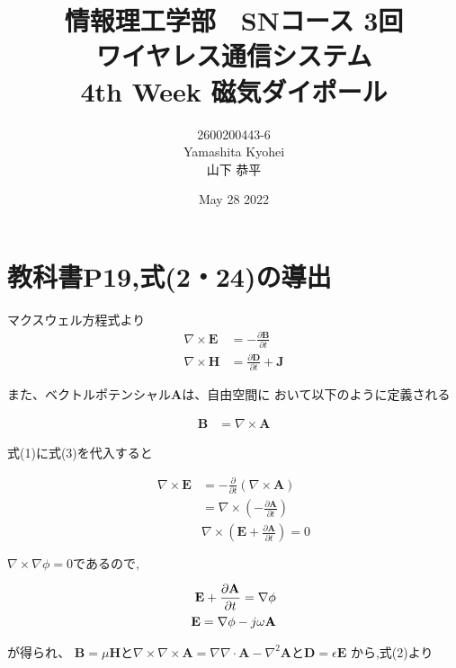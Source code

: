 \documentclass[dvipdfmx,autodetect-engine,titlepage]{jsarticle}
\title{情報理工学部　SNコース 3回\\
ワイヤレス通信システム\\
4th Week 磁気ダイポール}
\author{2600200443-6\\Yamashita Kyohei\\山下 恭平}
\date{May 28 2022}
\begin{document}
\maketitle

\section{教科書P19,式(2・24)の導出}

マクスウェル方程式より
\begin{align}
  \nabla \times \mathbf{E}  &= -\frac{\partial \mathbf{B} }{\partial t} \\
  \nabla \times \mathbf{H}  &= \frac{\partial \mathbf{D} }{\partial t} + \mathbf{J}
\end{align} 

また、ベクトルポテンシャル\begin{math}\mathbf{A}\end{math}は、自由空間に
おいて以下のように定義される

\begin{align}
  \mathbf{B} &= \nabla \times \mathbf{A}
\end{align}

式(1)に式(3)を代入すると

\begin{align*}
  \nabla \times \mathbf{E}  &= -\frac{\partial}{\partial t} (\nabla \times \mathbf{A})\\
  &= \nabla \times (-\frac{\partial \mathbf{A}}{\partial t}) \\
  &\nabla \times (\mathbf{E} + \frac{\partial \mathbf{A}}{\partial t}) = 0
\end{align*}

\begin{math}
  \nabla \times \nabla \phi = 0 であるので,
\end{math}

\begin{align}
  \mathbf{E} + \frac{\partial \mathbf{A}}{\partial t} = \nabla \phi \notag\\
  \mathbf{E} = \nabla \phi - j\omega\mathbf{A}
\end{align}

が得られ、
\begin{math}
  \mathbf{B} = \mu \mathbf{H} と \nabla \times \nabla \times \mathbf{A} = \nabla\nabla\cdot\mathbf{A} - \nabla^2 \mathbf{A} と \mathbf{D} = \epsilon \mathbf{E}
\end{math}
から,式(2)より
\end{document}

